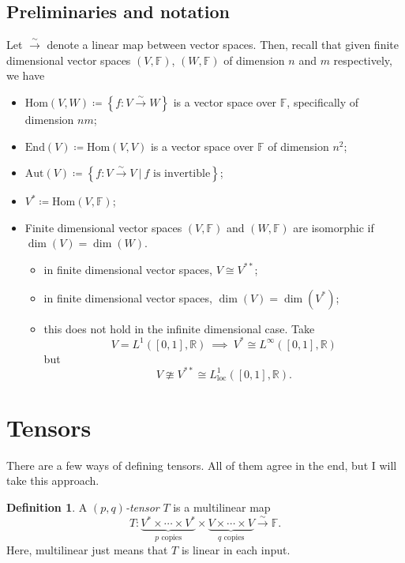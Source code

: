 \documentclass[12pt]{article}
\newcommand{\R}{\mathbb{R}}
\newcommand{\field}{\mathbb{F}}
\newcommand{\linmap}{\overset{\sim}{\longrightarrow}}
\newcommand{\Hom}{\mathrm{Hom}}
\newcommand{\End}{\mathrm{End}}
\newcommand{\Aut}{\mathrm{Aut}}
\theoremstyle{definition}
\newtheorem{definition}{Definition}[section]
\begin{document}
\subsection{Preliminaries and notation}

Let $\linmap$ denote a linear map between vector spaces.  Then, recall that given finite dimensional vector spaces $(V,\field)$, $(W,\field)$ of dimension $n$ and $m$ respectively, we have
\begin{itemize}
    \item $\Hom(V,W)\coloneqq \left\{f\colon V\linmap W\right\}$ is a vector space over $\field$, specifically of dimension $nm$;
    \item $\End(V)\coloneqq \Hom(V,V)$ is a vector space over $\field$ of dimension $n^2$;
    \item $\Aut(V)\coloneqq \left\{ f\colon V\linmap V ~\vert~ \textrm{$f$ is invertible}\right\}$;
    \item $V^*\coloneqq \Hom(V,\field)$;
    \item Finite dimensional vector spaces $(V,\field)$ and $(W,\field)$ are isomorphic if $\dim(V)=\dim(W)$.
    \begin{itemize}
        \item in finite dimensional vector spaces, $V\cong V^{**}$;
        \item in finite dimensional vector spaces, $\dim(V)=\dim(V^*)$;
        \item this does not hold in the infinite dimensional case. Take 
        \[V=L^1([0,1],\R) ~\implies~ V^*\cong L^\infty([0,1],\R)
        \]
        but
        \[
        V\ncong V^{**}\cong L^1_{\textrm{loc}}([0,1],\R).
        \]
    \end{itemize}
\end{itemize}

\section{Tensors}
There are a few ways of defining tensors.  All of them agree in the end, but I will take this approach.

\begin{definition}
A \emph{$(p,q)$-tensor} $T$ is a multilinear map
\[
T\colon \underbrace{V^*\times \cdots \times V^*}_{\textrm{$p$ copies}}\times \underbrace{V\times \cdots \times V}_{\textrm{$q$ copies}} \linmap \field.
\]
Here, multilinear just means that $T$ is linear in each input.
\end{definition}
\end{document}
